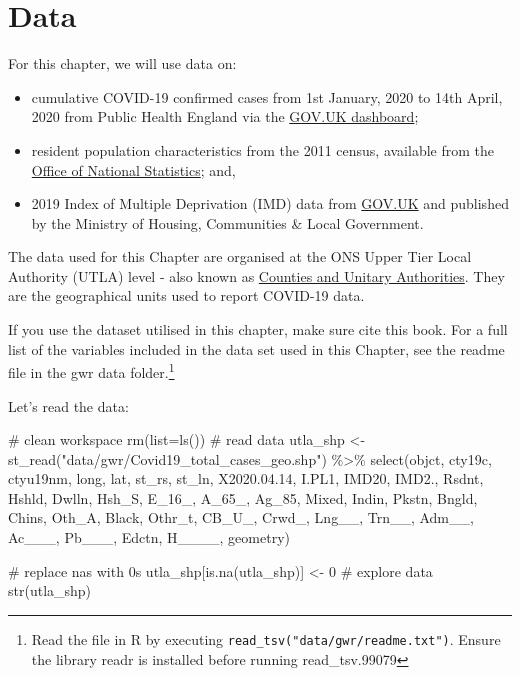 \documentclass[
  letterpaper,
  DIV=11,
  numbers=noendperiod,
  oneside]{scrreprt}
\newenvironment{Shaded}{\begin{snugshade}}{\end{snugshade}}
\newcommand{\AttributeTok}[1]{\textcolor[rgb]{0.40,0.45,0.13}{#1}}
\newcommand{\CommentTok}[1]{\textcolor[rgb]{0.37,0.37,0.37}{#1}}
\newcommand{\DecValTok}[1]{\textcolor[rgb]{0.68,0.00,0.00}{#1}}
\newcommand{\FloatTok}[1]{\textcolor[rgb]{0.68,0.00,0.00}{#1}}
\newcommand{\FunctionTok}[1]{\textcolor[rgb]{0.28,0.35,0.67}{#1}}
\newcommand{\NormalTok}[1]{\textcolor[rgb]{0.00,0.23,0.31}{#1}}
\newcommand{\OtherTok}[1]{\textcolor[rgb]{0.00,0.23,0.31}{#1}}
\newcommand{\SpecialCharTok}[1]{\textcolor[rgb]{0.37,0.37,0.37}{#1}}
\newcommand{\StringTok}[1]{\textcolor[rgb]{0.13,0.47,0.30}{#1}}
\begin{document}
\section{Data}\label{data-5}

For this chapter, we will use data on:

\begin{itemize}
\item
  cumulative COVID-19 confirmed cases from 1st January, 2020 to 14th
  April, 2020 from Public Health England via the
  \href{https://coronavirus.data.gov.uk}{GOV.UK dashboard};
\item
  resident population characteristics from the 2011 census, available
  from the \href{https://www.nomisweb.co.uk/home/census2001.asp}{Office
  of National Statistics}; and,
\item
  2019 Index of Multiple Deprivation (IMD) data from
  \href{https://www.gov.uk/government/statistics/english-indices-of-deprivation-2019}{GOV.UK}
  and published by the Ministry of Housing, Communities \& Local
  Government.
\end{itemize}

The data used for this Chapter are organised at the ONS Upper Tier Local
Authority (UTLA) level - also known as
\href{https://geoportal.statistics.gov.uk}{Counties and Unitary
Authorities}. They are the geographical units used to report COVID-19
data.

If you use the dataset utilised in this chapter, make sure cite this
book. For a full list of the variables included in the data set used in
this Chapter, see the readme file in the gwr data folder.\footnote{Read
  the file in R by executing \texttt{read\_tsv("data/gwr/readme.txt")}.
  Ensure the library readr is installed before running read\_tsv.99079}

Let's read the data:

\begin{Shaded}
\begin{Highlighting}[]
\CommentTok{\# clean workspace}
\FunctionTok{rm}\NormalTok{(}\AttributeTok{list=}\FunctionTok{ls}\NormalTok{())}
\CommentTok{\# read data}
\NormalTok{utla\_shp }\OtherTok{\textless{}{-}} \FunctionTok{st\_read}\NormalTok{(}\StringTok{"data/gwr/Covid19\_total\_cases\_geo.shp"}\NormalTok{) }\SpecialCharTok{\%\textgreater{}\%}
  \FunctionTok{select}\NormalTok{(objct, cty19c, ctyu19nm, long, lat, st\_rs, st\_ln, X2020.}\FloatTok{04.14}\NormalTok{, I.PL1, IMD20, IMD2., Rsdnt, Hshld, Dwlln, Hsh\_S, E\_16\_, A\_65\_, Ag\_85, Mixed, Indin, Pkstn, Bngld, Chins, Oth\_A, Black, Othr\_t, CB\_U\_, Crwd\_, Lng\_\_, Trn\_\_, Adm\_\_, Ac\_\_\_, Pb\_\_\_, Edctn, H\_\_\_\_, geometry)}

\CommentTok{\# replace nas with 0s}
\NormalTok{utla\_shp[}\FunctionTok{is.na}\NormalTok{(utla\_shp)] }\OtherTok{\textless{}{-}} \DecValTok{0}
\CommentTok{\# explore data}
\FunctionTok{str}\NormalTok{(utla\_shp)}
\end{Highlighting}
\end{Shaded}
\end{document}
